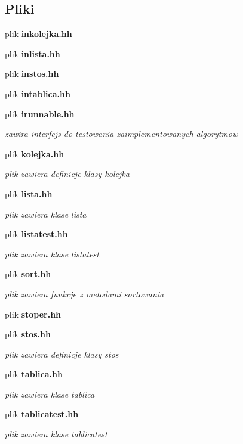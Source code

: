 \subsection*{Pliki}
\begin{DoxyCompactItemize}
\item 
plik {\bfseries inkolejka.\+hh}
\item 
plik {\bfseries inlista.\+hh}
\item 
plik {\bfseries instos.\+hh}
\item 
plik {\bfseries intablica.\+hh}
\item 
plik {\bf irunnable.\+hh}
\begin{DoxyCompactList}\small\item\em zawira interfejs do testowania zaimplementowanych algorytmow \end{DoxyCompactList}\item 
plik {\bf kolejka.\+hh}
\begin{DoxyCompactList}\small\item\em plik zawiera definicje klasy kolejka \end{DoxyCompactList}\item 
plik {\bf lista.\+hh}
\begin{DoxyCompactList}\small\item\em plik zawiera klase lista \end{DoxyCompactList}\item 
plik {\bf listatest.\+hh}
\begin{DoxyCompactList}\small\item\em plik zawiera klase listatest \end{DoxyCompactList}\item 
plik {\bf sort.\+hh}
\begin{DoxyCompactList}\small\item\em plik zawiera funkcje z metodami sortowania \end{DoxyCompactList}\item 
plik {\bfseries stoper.\+hh}
\item 
plik {\bf stos.\+hh}
\begin{DoxyCompactList}\small\item\em plik zawiera definicje klasy stos \end{DoxyCompactList}\item 
plik {\bf tablica.\+hh}
\begin{DoxyCompactList}\small\item\em plik zawiera klase tablica \end{DoxyCompactList}\item 
plik {\bf tablicatest.\+hh}
\begin{DoxyCompactList}\small\item\em plik zawiera klase tablicatest \end{DoxyCompactList}\end{DoxyCompactItemize}
